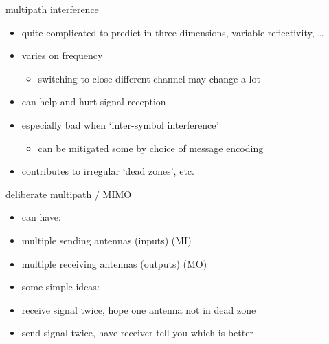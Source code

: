 \begin{frame}{multipath interference}
    \begin{itemize}
    \item quite complicated to predict in three dimensions, variable reflectivity, \ldots
    \item varies on frequency
        \begin{itemize}
        \item switching to close different channel may change a lot
        \end{itemize}
    \item can help and hurt signal reception
    \item especially bad when `inter-symbol interference'
        \begin{itemize}
        \item can be mitigated some by choice of message encoding
        \end{itemize}
    \vspace{.5cm}
    \item contributes to irregular `dead zones', etc.
    \end{itemize}
\end{frame}

\begin{frame}{deliberate multipath / MIMO}
    \begin{itemize}
    \item can have:
    \item multiple sending antennas (inputs) (MI)
    \item multiple receiving antennas (outputs) (MO)
    \item some simple ideas:
    \vspace{.5cm}
    \item receive signal twice, hope one antenna not in dead zone
    \item send signal twice, have receiver tell you which is better
    \end{itemize}
\end{frame}

